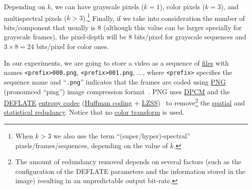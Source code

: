 Depending on $k$, we can have grayscale pixels ($k=1$), color pixels
($k=3$), and multispectral pixels ($k>3$).\footnote{When $k>3$ we also
use the term ``(super/hyper)-spectral'' pixels/frames/sequences, depending
on the value of $k$.} Finally, if we take into consideration the
number of bits/component that usually is $8$ (although this value can be larger
specially for grayscale frames), the pixel-depth will be $8$
bits/pixel for grayscale sequences and $3\times 8=24$ bits/pixel for
color ones.

In our experiments, we are going to store a video as a sequence of
\href{https://en.wikipedia.org/wiki/Computer_file}{files} with names
{\tt <prefix>000.png}, {\tt <prefix>001.png}, ..., where {\tt <prefix>} specifies the
sequence name and ``{\tt .png}'' indicates that the frames are coded using
\href{https://en.wikipedia.org/wiki/Portable_Network_Graphics}{PNG}
(pronounced ``ping'') image compression
format~\cite{roelofs1999png,world2003portable}. PNG uses
\href{https://en.wikipedia.org/wiki/Differential_pulse-code_modulation}{DPCM}
and the \href{https://en.wikipedia.org/wiki/DEFLATE}{DEFLATE}
\href{https://en.wikipedia.org/wiki/Entropy_coding}{entropy codec}
(\href{https://en.wikipedia.org/wiki/Huffman_coding}{Huffman coding} +
\href{https://en.wikipedia.org/wiki/Lempel-Ziv-Storer-Szymanski}{LZSS})~\cite{nelson96datacompression}
to remove\footnote{The amount of redundancy removed depends on several factors (such as the configuration of the DEFLATE parameters and the information stored in the image) resulting in an unpredictable output bit-rate.} the
\href{https://en.wikipedia.org/wiki/Image_compression}{spatial} and
\href{https://en.wikipedia.org/wiki/Data_compression}{statistical
  redudancy}. Notice that no
\href{https://en.wikipedia.org/wiki/YUV}{color transform} is
used.


